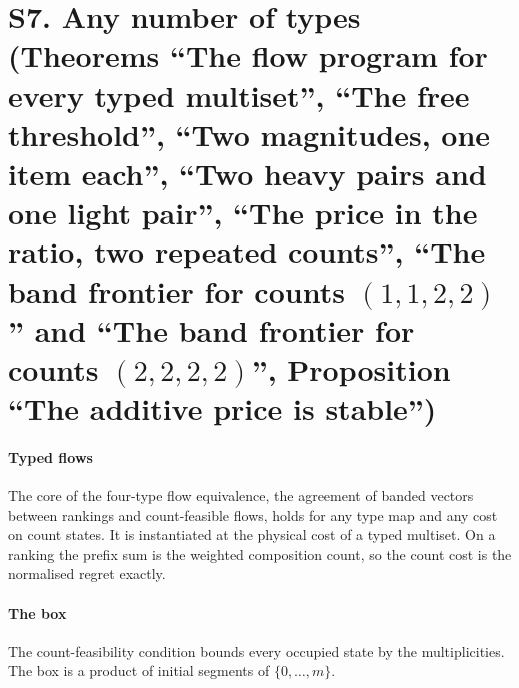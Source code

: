 
\section{S7. Any number of types (Theorems ``The flow program for every typed multiset'',
``The free threshold'', ``Two magnitudes, one item each'', ``Two heavy pairs and one light pair'',
``The price in the ratio, two repeated counts'', ``The band frontier for counts $(1,1,2,2)$'' and
``The band frontier for counts $(2,2,2,2)$'',
Proposition ``The additive price is stable'')}

\paragraph{Typed flows} The core of the four-type flow equivalence, the agreement of banded
vectors between rankings and count-feasible flows, holds for any type map and any cost on
count states. It is instantiated at the physical cost of a typed multiset. On a ranking the prefix
sum is the weighted composition count, so the count cost is the normalised regret exactly.

\paragraph{The box} The count-feasibility condition bounds every occupied state by the
multiplicities. The box is a product of initial segments of $\{0,\dots,m\}$.


